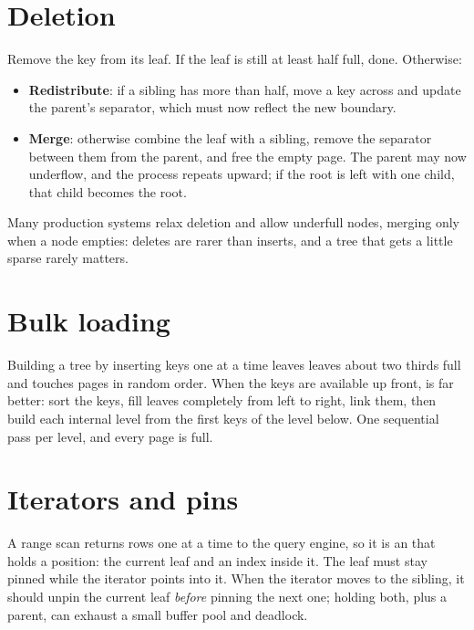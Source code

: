 \section{Deletion}

Remove the key from its leaf. If the leaf is still at least half full, done.
Otherwise:

\begin{itemize}
\item \textbf{Redistribute}: if a sibling has more than half, move a key across and update the parent's separator, which must now reflect the new boundary.
\item \textbf{Merge}: otherwise combine the leaf with a sibling, remove the separator between them from the parent, and free the empty page. The parent may now underflow, and the process repeats upward; if the root is left with one child, that child becomes the root.
\end{itemize}

Many production systems relax deletion and allow underfull nodes, merging only
when a node empties: deletes are rarer than inserts, and a tree that gets a
little sparse rarely matters.

\section{Bulk loading}

Building a tree by inserting keys one at a time leaves leaves about two thirds
full and touches pages in random order. When the keys are available up front,
 is far better: sort the keys, fill leaves completely from
left to right, link them, then build each internal level from the first keys of
the level below. One sequential pass per level, and every page is full.

\section{Iterators and pins}

A range scan returns rows one at a time to the query engine, so it is an
 that holds a position: the current leaf and an index inside it.
The leaf must stay pinned while the iterator points into it. When the iterator
moves to the sibling, it should unpin the current leaf \emph{before} pinning the
next one; holding both, plus a parent, can exhaust a small buffer pool and
deadlock.

